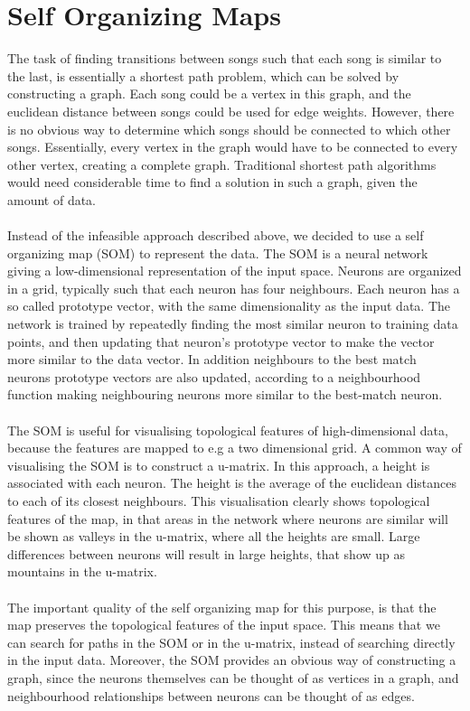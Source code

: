 \section{Self Organizing Maps} %
\label{sec:self_organizing_maps}
The task of finding transitions between songs such that each song is similar to the last, is essentially a shortest path problem, which can be solved by constructing a graph. Each song could be a vertex in this graph, and the euclidean distance between songs could be used for edge weights. However, there is no obvious way to determine which songs should be connected to which other songs. Essentially, every vertex in the graph would have to be connected to every other vertex, creating a complete graph. Traditional shortest path algorithms would need considerable time to find a solution in such a graph, given the amount of data.
\\\\
Instead of the infeasible approach described above, we decided to use a self organizing map (SOM) to represent the data. The SOM is a neural network giving a low-dimensional representation of the input space. Neurons are organized in a grid, typically such that each neuron has four neighbours. Each neuron has a so called prototype vector, with the same dimensionality as the input data. The network is trained by repeatedly finding the most similar neuron to training data points, and then updating that neuron's prototype vector to make the vector more similar to the data vector. In addition neighbours to the best match neurons prototype vectors are also updated, according to a neighbourhood function making neighbouring neurons more similar to the best-match neuron.
\\\\
The SOM is useful for visualising topological features of high-dimensional data, because the features are mapped to e.g a two dimensional grid. A common way of visualising the SOM is to construct a u-matrix. In this approach, a height is associated with each neuron. The height is the average of the euclidean distances to each of its closest neighbours. This visualisation clearly shows topological features of the map, in that areas in the network where neurons are similar will be shown as valleys in the u-matrix, where all the heights are small. Large differences between neurons will result in large heights, that show up as mountains in the u-matrix.
\\\\
The important quality of the self organizing map for this purpose, is that the map preserves the topological features of the input space. This means that we can search for paths in the SOM or in the u-matrix, instead of searching directly in the input data. Moreover, the SOM provides an obvious way of constructing a graph, since the neurons themselves can be thought of as vertices in a graph, and neighbourhood relationships between neurons can be thought of as edges.


